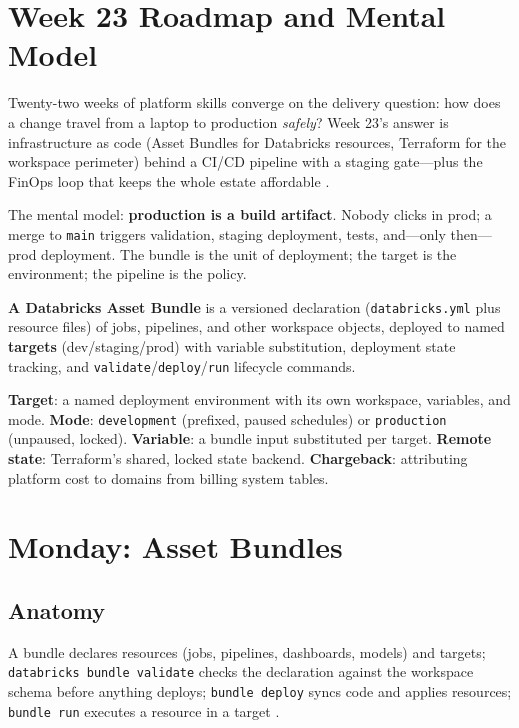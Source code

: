 \section{Week 23 Roadmap and Mental Model}
Twenty-two weeks of platform skills converge on the delivery question: how does a change travel from a laptop to production \emph{safely}? Week 23's answer is infrastructure as code (Asset Bundles for Databricks resources, Terraform for the workspace perimeter) behind a CI/CD pipeline with a staging gate---plus the FinOps loop that keeps the whole estate affordable \cite{databricksAssetBundles,terraformDatabricks}.

The mental model: \textbf{production is a build artifact}. Nobody clicks in prod; a merge to \texttt{main} triggers validation, staging deployment, tests, and---only then---prod deployment. The bundle is the unit of deployment; the target is the environment; the pipeline is the policy.

\begin{definitionbox}
\textbf{A Databricks Asset Bundle} is a versioned declaration (\texttt{databricks.yml} plus resource files) of jobs, pipelines, and other workspace objects, deployed to named \textbf{targets} (dev/staging/prod) with variable substitution, deployment state tracking, and \texttt{validate}/\texttt{deploy}/\texttt{run} lifecycle commands.
\end{definitionbox}

\begin{keyterms}
\textbf{Target}: a named deployment environment with its own workspace, variables, and mode. \textbf{Mode}: \texttt{development} (prefixed, paused schedules) or \texttt{production} (unpaused, locked). \textbf{Variable}: a bundle input substituted per target. \textbf{Remote state}: Terraform's shared, locked state backend. \textbf{Chargeback}: attributing platform cost to domains from billing system tables.
\end{keyterms}

\section{Monday: Asset Bundles}
\subsection{Anatomy}
A bundle declares resources (jobs, pipelines, dashboards, models) and targets; \texttt{databricks bundle validate} checks the declaration against the workspace schema before anything deploys; \texttt{bundle deploy} syncs code and applies resources; \texttt{bundle run} executes a resource in a target \cite{databricksAssetBundles}.

